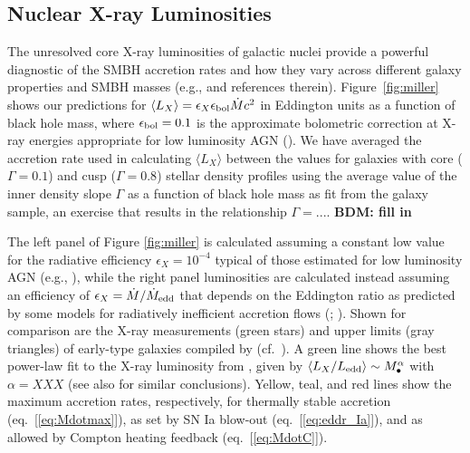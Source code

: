 \documentclass[usenatbib,fleqn]{mn2e}
\newcommand{\Mbh}[1][]{M_{\bullet#1}}
\begin{document}
\subsection{Nuclear X-ray Luminosities}
\label{sec:Lx}

The unresolved core X-ray luminosities of galactic nuclei provide a powerful diagnostic of the SMBH accretion rates and how they vary across different galaxy properties and SMBH masses (e.g.,  \citealt{Ho08}  and references therein).  Figure~\ref{fig:miller} shows our predictions for $\langle L_{X} \rangle =\epsilon_X \epsilon_{\rm bol} \dot{M} c^2$ in Eddington units as a function of black hole mass, where $\epsilon_{\rm bol} = 0.1$ is the approximate bolometric correction at X-ray energies appropriate for low luminosity AGN (\citealt{Ho08}).  We have averaged the accretion rate used in calculating $\langle L_X \rangle$ between the values for galaxies with core ($\Gamma = 0.1$) and cusp ($\Gamma = 0.8$) stellar density profiles using the average value of the inner density slope $\Gamma$ as a function of black hole mass as fit from the \citet{LauerFaber+:2007a} galaxy sample, an exercise that results in the relationship $\Gamma = ...$. {\bf BDM: fill in}   

The left panel of Figure \ref{fig:miller} is calculated assuming a constant low value for the radiative efficiency $\epsilon_X = 10^{-4}$ typical of those estimated for low luminosity AGN (e.g., \citealt{Ho:2009a}), while the right panel luminosities are calculated instead assuming an efficiency of $\epsilon_X= \dot{M}/\dot{M}_{\rm edd}$ that depends on the Eddington ratio as predicted by some models for radiatively inefficient accretion flows (\citealt{Narayan&Yi95}; \citealt{Narayan+98}).  Shown for comparison are the X-ray measurements (green stars) and upper limits (gray triangles) of early-type galaxies compiled by \citet{Miller+15} (cf.~\citealt{Gallo+10}).  A green line shows the best power-law fit to the X-ray luminosity from \citet{Miller+15}, given by $\langle L_X/L_{\rm edd}\rangle \sim \Mbh^\alpha$ with $\alpha = XXX$  (see also \citep{Zhang+09, Pellegrini10, Gallo+10} for similar conclusions).  Yellow, teal, and red lines show the maximum accretion rates, respectively, for thermally stable accretion (eq.~[\ref{eq:Mdotmax}]), as set by SN Ia blow-out (eq.~[\ref{eq:eddr_Ia}]), and as allowed by Compton heating feedback (eq.~[\ref{eq:MdotC}]).
\end{document}
